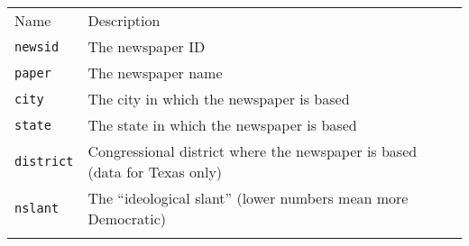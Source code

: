 \documentclass[]{article}
\begin{document}
\begin{longtable}[c]{@{}ll@{}}
\toprule\addlinespace
\begin{minipage}[b]{0.35\columnwidth}\raggedright
Name
\end{minipage} & \begin{minipage}[b]{0.57\columnwidth}\raggedright
Description
\end{minipage}
\\\addlinespace
\midrule\endhead
\begin{minipage}[t]{0.35\columnwidth}\raggedright
\texttt{newsid}
\end{minipage} & \begin{minipage}[t]{0.57\columnwidth}\raggedright
The newspaper ID
\end{minipage}
\\\addlinespace
\begin{minipage}[t]{0.35\columnwidth}\raggedright
\texttt{paper}
\end{minipage} & \begin{minipage}[t]{0.57\columnwidth}\raggedright
The newspaper name
\end{minipage}
\\\addlinespace
\begin{minipage}[t]{0.35\columnwidth}\raggedright
\texttt{city}
\end{minipage} & \begin{minipage}[t]{0.57\columnwidth}\raggedright
The city in which the newspaper is based
\end{minipage}
\\\addlinespace
\begin{minipage}[t]{0.35\columnwidth}\raggedright
\texttt{state}
\end{minipage} & \begin{minipage}[t]{0.57\columnwidth}\raggedright
The state in which the newspaper is based
\end{minipage}
\\\addlinespace
\begin{minipage}[t]{0.35\columnwidth}\raggedright
\texttt{district}
\end{minipage} & \begin{minipage}[t]{0.57\columnwidth}\raggedright
Congressional district where the newspaper is based (data for Texas
only)
\end{minipage}
\\\addlinespace
\begin{minipage}[t]{0.35\columnwidth}\raggedright
\texttt{nslant}
\end{minipage} & \begin{minipage}[t]{0.57\columnwidth}\raggedright
The ``ideological slant'' (lower numbers mean more Democratic)
\end{minipage}
\\\addlinespace
\bottomrule
\end{longtable}
\end{document}
